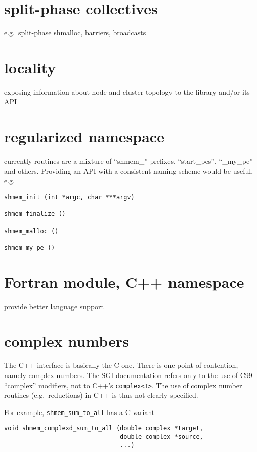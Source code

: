 \section{split-phase collectives}

e.g.\ split-phase shmalloc, barriers, broadcasts

\section{locality}

exposing information about node and cluster topology to the library
and/or its API

\section{regularized namespace}

currently routines are a mixture of ``shmem\_'' prefixes,
``start\_pes'', ``\_my\_pe'' and others. Providing an API with a
consistent naming scheme would be useful, e.g.\

\begin{lstlisting}[language=OSH2+C]
shmem_init (int *argc, char ***argv)

shmem_finalize ()

shmem_malloc ()

shmem_my_pe ()
\end{lstlisting}

\section{Fortran module, C++ namespace}

provide better language support

\section{complex numbers}

The C++ interface is basically the C one. There is one point of
contention, namely complex numbers. The SGI documentation refers only
to the use of C99 ``complex'' modifiers, not to C++'s
\texttt{complex<T>}.  The use of complex number routines (e.g.\
reductions) in C++ is thus not clearly specified.

For example, \texttt{shmem\_sum\_to\_all} has a C variant

\begin{lstlisting}[language=OSH+C]
void shmem_complexd_sum_to_all (double complex *target,
                                double complex *source,
                                ...)
\end{lstlisting}

